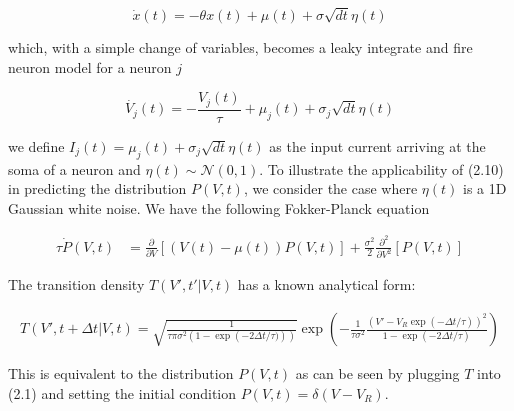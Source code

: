 \documentclass{ucetd}
\begin{document}
\begin{equation*}
\dot{x}(t) = -\theta x(t) + \mu(t) + \sigma\sqrt{dt}\eta(t)
\end{equation*}

which, with a simple change of variables, becomes a leaky integrate and fire neuron model for a neuron $j$

\begin{equation*}
\dot{V_{j}}(t) = -\frac{V_{j}(t)}{\tau} + \mu_{j}(t) + \sigma_{j}\sqrt{dt}\eta(t)
\end{equation*}

we define $I_{j}(t) = \mu_{j}(t) + \sigma_{j}\sqrt{dt}\eta(t)$ as the input current arriving at the soma of a neuron and $\eta(t) \sim \mathcal{N}(0,1)$. To illustrate the applicability of (2.10) in predicting the distribution $P(V,t)$, we consider the case where $\eta(t)$ is a 1D Gaussian white noise. We have the following Fokker-Planck equation

\begin{align}
\tau\dot{P}(V,t) &= \frac{\partial}{\partial V}[\left(V(t)-\mu(t)\right) P(V,t)] + \frac{\sigma^{2}}{2}\frac{\partial^{2}}{\partial V^{2}}[P(V,t)]
\end{align}

The transition density $T(V',t'|V,t)$ has a known analytical form:

\begin{align*}
T(V',t+\Delta t|V,t) = \sqrt{\frac{1}{\tau\pi\sigma^{2}(1-\exp\left(-2\Delta t/\tau)\right))}}\exp\left(-\frac{1}{\tau\sigma^{2}}\frac{(V'-V_{R}\exp(-\Delta t/\tau))^{2}}{1-\exp\left(-2\Delta t/\tau\right)}\right)
\end{align*} 

This is equivalent to the distribution $P(V,t)$ as can be seen by plugging $T$ into (2.1) and setting the initial condition $P(V,t) = \delta(V-V_{R})$.
\end{document}
